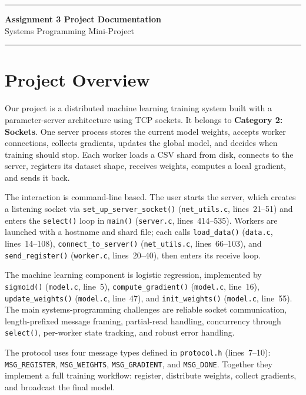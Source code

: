 \documentclass[11pt]{article}
\begin{document}
\begingroup
\centering
\singlespacing
\rule{\textwidth}{0.8pt}\vspace{4pt}

{\Large \bfseries Assignment 3 Project Documentation}\\[4pt]
{\large Systems Programming Mini-Project}

\vspace{4pt}\rule{\textwidth}{0.8pt}
\endgroup


\section{Project Overview}

Our project is a distributed machine learning training system built with a parameter-server architecture using TCP sockets. It belongs to \textbf{Category 2: Sockets}. One server process stores the current model weights, accepts worker connections, collects gradients, updates the global model, and decides when training should stop. Each worker loads a CSV shard from disk, connects to the server, registers its dataset shape, receives weights, computes a local gradient, and sends it back.

The interaction is command-line based. The user starts the server, which creates a listening socket via \texttt{set\_up\_server\_socket()} (\texttt{net\_utils.c}, lines~21--51) and enters the \texttt{select()} loop in \texttt{main()} (\texttt{server.c}, lines~414--535). Workers are launched with a hostname and shard file; each calls \texttt{load\_data()} (\texttt{data.c}, lines~14--108), \texttt{connect\_to\_server()} (\texttt{net\_utils.c}, lines~66--103), and \texttt{send\_register()} (\texttt{worker.c}, lines~20--40), then enters its receive loop.

The machine learning component is logistic regression, implemented by \texttt{sigmoid()} (\texttt{model.c}, line~5), \texttt{compute\_gradient()} (\texttt{model.c}, line~16), \texttt{update\_weights()} (\texttt{model.c}, line~47), and \texttt{init\_weights()} (\texttt{model.c}, line~55). The main systems-programming challenges are reliable socket communication, length-prefixed message framing, partial-read handling, concurrency through \texttt{select()}, per-worker state tracking, and robust error handling.

The protocol uses four message types defined in \texttt{protocol.h} (lines~7--10): \texttt{MSG\_REGISTER}, \texttt{MSG\_WEIGHTS}, \texttt{MSG\_GRADIENT}, and \texttt{MSG\_DONE}. Together they implement a full training workflow: register, distribute weights, collect gradients, and broadcast the final model.
\end{document}
